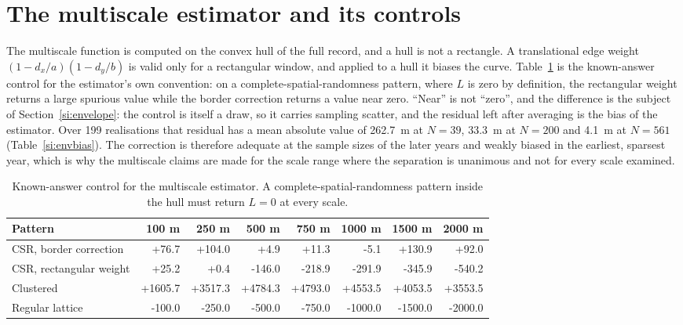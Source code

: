 \documentclass[fleqn,10pt]{wlpeerj}
\begin{document}
\section{The multiscale estimator and its controls}
\label{si:lcurve}

The multiscale function is computed on the convex hull of the full record, and a hull is not a
rectangle. A translational edge weight $(1-d_x/a)(1-d_y/b)$ is valid only for a rectangular
window, and applied to a hull it biases the curve. Table~\ref{si:lcontrol} is the known-answer
control for the estimator's own convention: on a complete-spatial-randomness pattern, where $L$ is zero by
definition, the rectangular weight returns a large spurious value while the border correction
returns a value near zero. ``Near'' is not ``zero'', and the difference is the subject of
Section~\ref{si:envelope}: the control is itself a draw, so it carries sampling scatter, and the
residual left after averaging is the bias of the estimator. Over \num{199} realisations that
residual has a mean absolute value of \SI{262.7}{\meter} at $N = 39$, \SI{33.3}{\meter} at
$N = 200$ and \SI{4.1}{\meter} at $N = 561$ (Table~\ref{si:envbias}). The correction is therefore
adequate at the sample sizes of the later years and weakly biased in the earliest, sparsest year,
which is why the multiscale claims are made for the scale range where the separation is unanimous
and not for every scale examined.

\begin{table}[H]
\centering
\caption{Known-answer control for the multiscale estimator. A complete-spatial-randomness
pattern inside the hull must return $L = 0$ at every scale.}
\label{si:lcontrol}
\footnotesize
\setlength{\tabcolsep}{4pt}
\begin{adjustbox}{max width=\linewidth}
\begin{tabular}{lrrrrrrr}
\toprule
Pattern & 100 m & 250 m & 500 m & 750 m & 1000 m & 1500 m & 2000 m \\
\midrule
CSR, border correction & +76.7 & +104.0 & +4.9 & +11.3 & -5.1 & +130.9 & +92.0 \\
CSR, rectangular weight & +25.2 & +0.4 & -146.0 & -218.9 & -291.9 & -345.9 & -540.2 \\
Clustered & +1605.7 & +3517.3 & +4784.3 & +4793.0 & +4553.5 & +4053.5 & +3553.5 \\
Regular lattice & -100.0 & -250.0 & -500.0 & -750.0 & -1000.0 & -1500.0 & -2000.0 \\
\bottomrule
\end{tabular}
\end{adjustbox}
\end{table}
\end{document}
